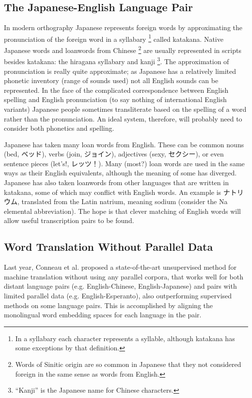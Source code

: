\documentclass{article}
\begin{document}
\subsection*{The Japanese-English Language Pair}

In modern orthography
Japanese represents foreign words
by approximating the pronunciation of the foreign word
in a syllabary \footnote{In a syllabary each character represents a syllable,
although katakana has some exceptions by that definition.} called katakana.
Native Japanese words and loanwords from Chinese
\footnote{Words of Sinitic origin are so common in Japanese that they not considered
  foreign in the same sense as words from English.}
are usually represented in scripts besides katakana:
the hiragana syllabary and kanji
\footnote{``Kanji'' is the Japanese name for Chinese characters.}.
The approximation of pronunciation is really quite approximate;
as Japanese has a relatively limited phonetic inventory (range of sounds used)
not all English sounds can be represented.
In the face of the complicated correspondence
between English spelling and English pronunciation
(to say nothing of international English variants)
Japanese people sometimes transliterate based on the spelling of a word
rather than the pronunciation.
An ideal system,
therefore,
will probably need to consider both phonetics and spelling.

Japanese has taken many loan words from English.
These can be common nouns (bed, ベッド),
verbs (join, ジョイン),
adjectives (sexy, セクシー),
or even sentence pieces (let's!, レッツ！).
Many (most?) loan words
are used in the same ways as their English equivalents,
although the meaning of some has diverged.
Japanese has also taken loanwords from other languages
that are written in katakana,
some of which may conflict with English words.
An example is ナトリウム,
translated from the Latin natrium,
meaning sodium (consider the Na elemental abbreviation).
The hope is that clever matching of English words
will allow useful transcription pairs to be found.

\subsection*{Word Translation Without Parallel Data}

Last year, Conneau et al. proposed a state-of-the-art unsupervised method for machine
translation without using any parallel corpora, that works well for both distant
language pairs (e.g. English-Chinese, English-Japanese) and pairs with limited parallel
data (e.g. English-Esperanto), also outperforming supervised methods on some language
pairs. This is accomplished by aligning the monolingual word embedding spaces for each
language in the pair.
\end{document}

